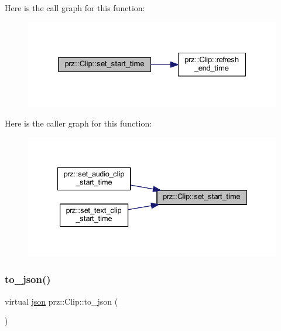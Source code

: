 Here is the call graph for this function\+:
\nopagebreak
\begin{figure}[H]
\begin{center}
\leavevmode
\includegraphics[width=325pt]{classprz_1_1_clip_a7cbb55c3a344ab273d655f3b1e3fe5d1_cgraph}
\end{center}
\end{figure}
Here is the caller graph for this function\+:
\nopagebreak
\begin{figure}[H]
\begin{center}
\leavevmode
\includegraphics[width=335pt]{classprz_1_1_clip_a7cbb55c3a344ab273d655f3b1e3fe5d1_icgraph}
\end{center}
\end{figure}
\mbox{\label{classprz_1_1_clip_a4959ada0fab0fbac6cb5239578ac3ec6}} 
\subsubsection{\texorpdfstring{to\_json()}{to\_json()}}
{\footnotesize\ttfamily virtual \mbox{\hyperlink{namespaceprz_a2d8e9eeb62cf098759f1fff869da67f7}{json}} prz\+::\+Clip\+::to\+\_\+json (\begin{DoxyParamCaption}{ }\end{DoxyParamCaption})\hspace{0.3cm}{\ttfamily [pure virtual]}}



